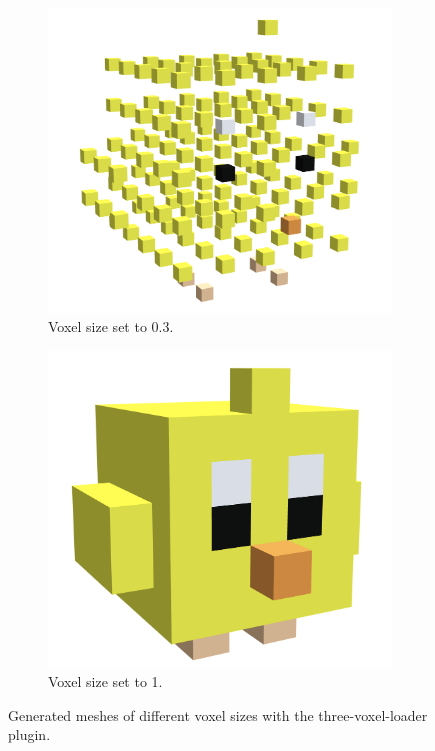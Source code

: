 \begin{figure}[htp]
    \centering
    \begin{subfigure}[t]{0.45\textwidth}
        \centering
        \includegraphics[width=\textwidth]{sections/result/figures/chicken-voxels-size-0.3.png}
        \caption{Voxel size set to 0.3.}
        \label{fig:chicken-voxels-size-0.3}
    \end{subfigure}
    \hfill
    \begin{subfigure}[t]{0.45\textwidth}
        \centering
        \includegraphics[width=\textwidth]{sections/result/figures/chicken-voxels-size-1.png}
        \caption{Voxel size set to 1.}
        \label{fig:chicken-voxels-size-1}
    \end{subfigure}
       \caption{Generated meshes of different voxel sizes with the three-voxel-loader plugin.}
       \label{fig:chicken-voxels-sizes}
\end{figure}


